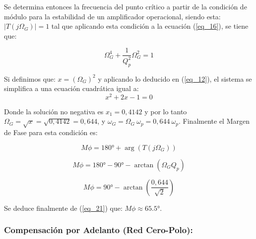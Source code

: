 \documentclass[12pt,a4paper]{article}
\begin{document}
    
    Se determina entonces la frecuencia del punto crítico a partir de la condición de módulo para la estabilidad de un amplificador operacional, siendo esta: $|T(j\Omega_G)|=1$ tal que aplicando esta condición  a la ecuación (\ref{eq_16}), se tiene que:

    \begin{equation}
        \label{eq_17}
        \Omega_G^4 + \frac{1}{Q_p^2} \Omega_G^2 = 1
    \end{equation}
    \hspace{0.5 cm}

    
    Si definimos que: $x=(\Omega_G)^2$ y aplicando lo deducido en (\ref{eq_12}), el sistema se simplifica a una ecuación cuadrática igual a:\\
    
    \begin{equation}
        \label{eq_18}
        x^2 + 2x - 1 = 0
    \end{equation}
    \hspace{0.5 cm}

    
    Donde la solución no negativa es $x_1=0,4142$ y por lo tanto $\Omega_G=\sqrt{x}=\sqrt{0,4142}=0,644$, y $\omega_G = \Omega_G \ \omega_p = 0,644 \ \omega_p$. Finalmente el Margen de Fase para esta condición es:
    
    \begin{equation}
        \label{eq_19}
        M\phi = \ang{180} + \arg(T(j\Omega_G))
    \end{equation}

    \begin{equation}
        \label{eq_20}
        M\phi = \ang{180} - \ang{90} - \arctan(\Omega_G Q_p)  
    \end{equation}
    
    \begin{equation}
        \label{eq_21}
        M\phi = \ang {90} - \arctan\left(\frac{0,644}{\sqrt{2}}\right) 
    \end{equation}
    \hspace{0.5 cm}

    
    Se deduce finalmente de (\ref{eq_21}) que: $M\phi \approx \ang{65,5}$.\\
    \hspace{1 cm}

\subsubsection{Compensación por Adelanto (Red Cero-Polo):}
\end{document}
